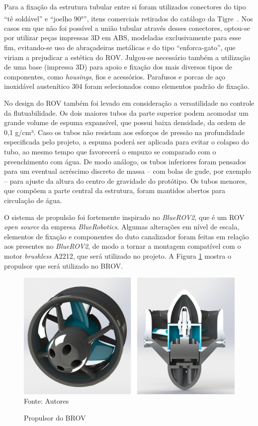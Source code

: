 Para a fixação da estrutura tubular entre si foram utilizados conectores do tipo ``tê soldável'' e ``joelho 90°'', itens comerciais retirados do catálogo da Tigre\,\textsuperscript{\tiny\textregistered} \cite{Tigre2009}. Nos casos em que não foi possível a união tubular através desses conectores, optou-se por utilizar peças impressas 3D em ABS, modeladas exclusivamente para esse fim, evitando-se uso de abraçadeiras metálicas e do tipo ``enforca-gato'', que viriam a prejudicar a estética do ROV. Julgou-se necessário também a utilização de uma base (impressa 3D) para apoio e fixação dos mais diversos tipos de componentes, como \textit{housings}, fios e acessórios. Parafusos e porcas de aço inoxidável austenítico 304 foram selecionados como elementos padrão de fixação. 

No design do ROV também foi levado em consideração a versatilidade no controle da flutuabilidade. Os dois maiores tubos da parte superior podem acomodar um grande volume de espuma expansível, que possui baixa densidade, da ordem de 0,1 g/cm³. Caso os tubos não resistam aos esforços de pressão na profundidade especificada pelo projeto, a espuma poderá ser aplicada para evitar o colapso do tubo, ao mesmo tempo que favorecerá o empuxo se comparado com o preenchimento com água. De modo análogo, os tubos inferiores foram pensados para um eventual acréscimo discreto de massa -- com bolas de gude, por exemplo -- para ajuste da altura do centro de gravidade do protótipo. Os tubos menores, que compõem a parte central da estrutura, foram mantidos abertos para circulação de água.

O sistema de propulsão foi fortemente inspirado no \textit{BlueROV2}, que é um ROV \textit{open source} da empresa \textit{BlueRobotics}. Algumas alterações em nível de escala, elementos de fixação e componentes do duto canalizador foram feitas em relação aos presentes no \textit{BlueROV2}, de modo a tornar a montagem compatível com o motor \textit{brushless} A2212, que será utilizado no projeto. A Figura \ref{fig:propulsor} mostra o propulsor que será utilizado no BROV.

\begin{figure}[h]
	\centering
	\caption{Propulsor do BROV}
	\label{fig:propulsor}
	\includegraphics[width=0.8\linewidth]{images/propulsor}\\
	\footnotesize Fonte: Autores
\end{figure}

